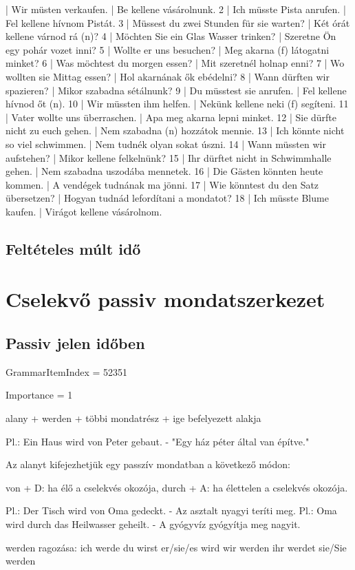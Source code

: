 \documentclass{article}
\newenvironment{desc}{\verbatim}{\endverbatim}
\newenvironment{exmp}{\verbatim}{\endverbatim}
\begin{document}
\begin{exmp}
1 | Wir müsten verkaufen. | Be kellene vásárolnunk.
2 | Ich müsste Pista anrufen. | Fel kellene hívnom Pistát.
3 | Müssest du zwei Stunden für sie warten? | Két órát kellene várnod rá (n)?
4 | Möchten Sie ein Glas Wasser trinken? | Szeretne Ön egy pohár vozet inni?
5 | Wollte er uns besuchen? | Meg akarna (f) látogatni minket?
6 | Was möchtest du morgen essen? | Mit szeretnél holnap enni?
7 | Wo wollten sie Mittag essen? | Hol akarnának ők ebédelni?
8 | Wann dürften wir spazieren? | Mikor szabadna sétálnunk?
9 | Du müsstest sie anrufen. | Fel kellene hívnod őt (n).
10 | Wir müssten ihm helfen. | Nekünk kellene neki (f) segíteni.
11 | Vater wollte uns überraschen. | Apa meg akarna lepni minket.
12 | Sie dürfte nicht zu euch gehen. | Nem szabadna (n) hozzátok mennie.
13 | Ich könnte nicht so viel schwimmen. | Nem tudnék olyan sokat úszni.
14 | Wann müssten wir aufstehen? | Mikor kellene felkelnünk?
15 | Ihr dürftet nicht in Schwimmhalle gehen. | Nem szabadna uszodába mennetek.
16 | Die Gästen könnten heute kommen. | A vendégek tudnának ma jönni.
17 | Wie könntest du den Satz übersetzen? | Hogyan tudnád lefordítani a mondatot?
18 | Ich müsste Blume kaufen. | Virágot kellene vásárolnom.
\end{exmp}

\subsection{Feltételes múlt idő}

\section{Cselekvő passiv mondatszerkezet}

\subsection{Passiv jelen időben}

GrammarItemIndex = 52351

Importance = 1

\begin{desc}
alany + werden + többi mondatrész + ige befelyezett alakja

Pl.: Ein Haus wird von Peter gebaut. - "Egy ház péter által van építve."

Az alanyt kifejezhetjük egy passzív mondatban a következő módon:

von + D: ha élő a cselekvés okozója,
durch + A: ha élettelen a cselekvés okozója.

Pl.: Der Tisch wird von Oma gedeckt. - Az asztalt nyagyi teríti meg.
Pl.: Oma wird durch das Heilwasser geheilt. - A gyógyvíz gyógyítja meg nagyit.

werden ragozása:
ich werde
du wirst
er/sie/es wird
wir werden
ihr werdet
sie/Sie werden
\end{desc}
\end{document}
